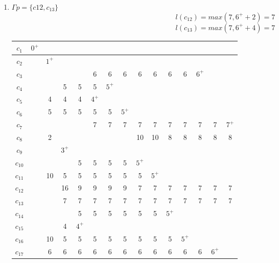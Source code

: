 \documentclass[12pt, a4paper] {ncc}
\begin{document}
\begin{enumerate}
	\item $\Gamma p = \{ c{12}, c_{13}\}$
	$$l(c_{12}) = max(7, 6^+ + 2) = 7 $$
	$$l(c_{13}) = max(7, 6^+ + 4) = 7 $$
\begin{tabular} {|c|c|c|c|c|c|c|c|c|c|c|c|c|c|c|}
    \hline
    $c_{1}$  &$0^+$&      &     &     &     &     &     &      &     &     &     &     &  	 &         \\ \hline
    $c_{2}$  & \z  &$1^+$ &     &     &     &     &     &      &     &     &     &     &  	 &         \\ \hline
    $c_{3}$  & \z  & \z   & \z  &\z   & 6   &  6  &  6  &  6   & 6   & 6   & 6   &$6^+$&  	 &         \\ \hline
    $c_{4}$  & \z  & \z   & 5   & 5   & 5   &$5^+$&     &      &     &     &     &     &  	 &         \\ \hline
    $c_{5}$  & \z  & 4    & 4   & 4   &$4^+$&     &     &      &     &     &     &     &  	 &         \\ \hline
    $c_{6}$  & \z  & 5    & 5   & 5   & 5   &  5  &$5^+$&      &     &     &     &     &  	 &         \\ \hline
    $c_{7}$  & \z  & \z   & \z  & \z  & 7   &  7  &  7  &  7   & 7   & 7   & 7   &7    & 7	 & $7^+$      \\ \hline
    $c_{8}$  & \z  & 2    & \z  & \z  & \z  &  \z & \z  &  10  & 10  & 8   & 8   &8    & 8	 &  8      \\ \hline
    $c_{9}$  & \z  & \z   &$3^+$&     &     &     &     &      &     &     &     &     &  	 &         \\ \hline
    $c_{10}$ & \z  & \z   & \z  & 5   & 5   &  5  &  5  &$5^+$ &     &     &     &     &  	 &         \\ \hline
    $c_{11}$ & \z  & 10   &  5  & 5   & 5   &  5  &  5  &  5   &$5^+$&     &     &     &  	 &         \\ \hline
    $c_{12}$ & \z  & \z   & 16  & 9   & 9   &  9  &  9  &  7   & 7   & 7   & 7   & 7   & 7	 &  7      \\ \hline
    $c_{13}$ & \z  & \z   & 7   & 7   & 7   &  7  &  7  &  7   & 7   & 7   & 7   & 7   & 7   &	7     \\ \hline
    $c_{14}$ & \z  & \z   & \z  & 5   & 5   &  5  &  5  &  5   & 5   &$5^+$&     &     &  	 &         \\ \hline
    $c_{15}$ & \z  & \z   & 4   &$4^+$&     &     &     &      &     &     &     &     &  	 &         \\ \hline
    $c_{16}$ & \z  & 10   & 5   & 5   & 5   &  5  &  5  &  5   & 5   & 5   &$5^+$&     &  	 &         \\ \hline
    $c_{17}$ & \z  & 6    & 6   & 6   & 6   &  6  &  6  &  6   & 6   & 6   & 6   & 6   &$6^+$&	      \\ \hline 
\end{tabular}


\end{enumerate}
\end{document}
